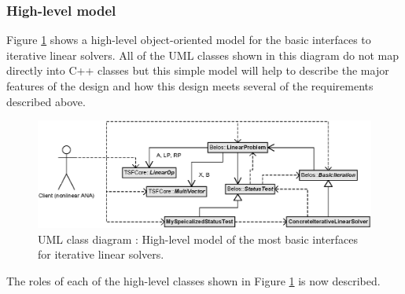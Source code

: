 \documentclass[pdf,ps2pdf,11pt]{SANDreport}
\begin{document}
\subsubsection{High-level model}

Figure {}\ref{belos:fig:BelosInterfacesSimple} shows a high-level
object-oriented model for the basic interfaces to iterative linear
solvers.  All of the UML classes shown in this diagram do not map
directly into C++ classes but this simple model will help to describe
the major features of the design and how this design meets several of
the requirements described above.

{\bsinglespace
\begin{figure}[t]
\begin{center}
\includegraphics*[scale=0.85]{BelosInterfacesSimple}
\end{center}
\caption{
\label{belos:fig:BelosInterfacesSimple}
UML class diagram : High-level model of
the most basic interfaces for iterative linear solvers.}
\end{figure}
\esinglespace}

The roles of each of the high-level classes shown in Figure
{}\ref{belos:fig:BelosInterfacesSimple} is now described.
\end{document}
